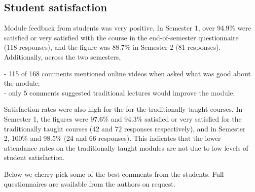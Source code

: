 \documentclass{amsart}
\begin{document}
\subsection*{Student satisfaction}

Module feedback from students was very positive. In Semester 1, over 94.9\% were satisfied or very satisfied with the course in the end-of-semester questionnaire (118 responses), and the figure was 88.7\% in Semester 2 (81 responses). Additionally, across the two semesters,

- 115 of 168 comments mentioned online videos when asked what was good about the module;\\
- only 5 comments suggested traditional lectures would improve the module.

Satisfaction rates were also high for the for the traditionally taught courses.  In Semester 1, the figures were 97.6\% and 94.3\% satisfied or very satisfied for the traditionally taught courses (42 and 72 responses respectively), and in Semester 2, 100\% and 98.5\% (24 and 66 responses).  This indicates that the lower attendance rates on the traditionally taught modules are not due to low levels of student satisfaction.

Below we cherry-pick some of the best comments from the students.  Full questionnaires are available from the authors on request.
\end{document}
